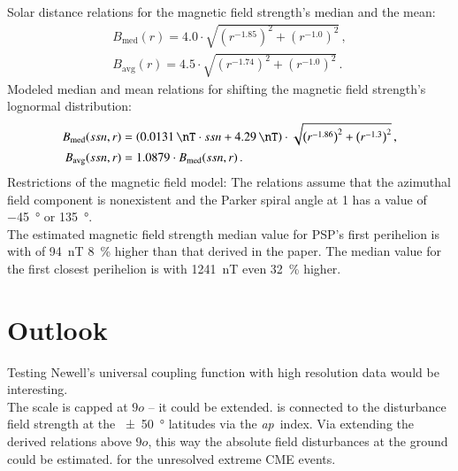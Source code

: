 Solar distance relations for the magnetic field strength's median and the mean:
\begin{align}
	B_\text{med}(r) = 4.0 \cdot \sqrt{\left(r^{-1.85}\right)^2 + \left(r^{-1.0}\right)^2}	\,,\\
	B_\text{avg}(r) = 4.5 \cdot \sqrt{\left(r^{-1.74}\right)^2 + \left(r^{-1.0}\right)^2}	\,.
\end{align}
Modeled median and mean relations for shifting the magnetic field strength's lognormal distribution:
\begin{align}
	B_\text{med}(ssn,r) &= \left(\SI{0.0131}{\nT} \cdot ssn + \SI{4.29}{\nT}\right) \cdot \sqrt{\left(r^{-1.86}\right)^2 + \left(r^{-1.3}\right)^2}	\,,\\
	B_\text{avg}(ssn,r) &= 1.0879 \cdot B_\text{med}(ssn,r)	\,.
\end{align}
Restrictions of the magnetic field model: The relations assume that the azimuthal field component is nonexistent and the Parker spiral angle at \SI{1}{\au} has a value of \SI{-45}{\degree} or \SI{135}{\degree}.\\

The estimated magnetic field strength median value for PSP's first perihelion is with of \SI{94}{\nano\tesla} \SI{8}{\%} higher than that derived in the paper. The median value for the first closest perihelion is with \SI{1241}{\nano\tesla} even \SI{32}{\%} higher.\\


\section{Outlook}



Testing Newell's universal coupling function with high resolution data would be interesting.\\

The \Kp{} scale is capped at $9o$ -- it could be extended. \Kp{} is connected to the disturbance field strength at the \SI{+-50}{\degree} latitudes via the \textit{ap}~index. Via extending the derived \Kp{} relations above $9o$, this way the absolute field disturbances at the ground could be estimated. for the unresolved extreme CME events.\\

